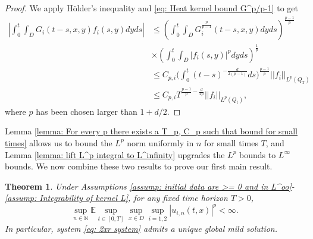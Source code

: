 \documentclass[12pt]{article}
\newtheorem{theorem}{Theorem}[section]
\theoremstyle{definition}
\theoremstyle{remark}
\begin{document}
\begin{proof}
We apply H\"older's inequality and \eqref{eq: Heat kernel bound G^p/p-1} to get
\begin{align*}
\left|\int_0^t\int_D G_i(t-s,x,y)f_{i}(s,y)dyds \right| &\leq \left(\int_0^t\int_D G_i^{\frac{p}{p-1}}(t-s,x,y)dyds\right)^{\frac{p-1}{p}}\\
&\times\left(\int_0^t\int_D |f_{i}(s,y)|^pdyds \right)^{\frac{1}{p}}\\
&\leq C_{p,i}\Big(\int_0^t (t-s)^{-\frac{d}{2(p-1)}}ds\Big)^{\frac{p-1}{p}}||f_{i}||_{L^p(Q_T)}\\
& \leq  C_{p,i}T^{\frac{p-1}{p}-\frac{d}{2p}}||f_{i}||_{L^p(Q_{t})},
\end{align*}
where $p$ has been chosen larger than $1+d/2$.
\end{proof}
Lemma \ref{lemma: For every p there exists a T_p, C_p such that bound for small times} allows us to bound the $L^p$ norm uniformly in $n$ for small times $T$, and Lemma \ref{lemma: lift L^p integral to L^infinity} upgrades the $L^p$ bounds to $L^{\infty}$ bounds. We now combine these two results to prove our first main result.
\begin{theorem}\label{thm: Theorem 2xr}
    Under Assumptions \ref{assump: initial data are >= 0 and in L^oo}-\ref{assump: Integrability of kernel L}, for any fixed time horizon $T>0$,
    \begin{equation*}
\sup_{n\in \mathbb N} \mathbb E \sup_{t\in [0,T]}\sup_{x\in D}\sup_{i=1,2} |u_{i,n}(t,x)|^p < \infty.
\end{equation*}
In particular, system \eqref{eq: 2xr system} admits a unique global mild solution.
\end{theorem}
\end{document}
